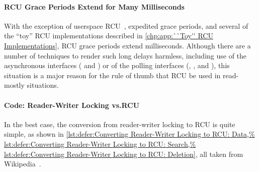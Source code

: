 \QuickQuizEnd

\paragraph{RCU Grace Periods Extend for Many Milliseconds}

With the exception of userspace
RCU~\cite{MathieuDesnoyers2009URCU,PaulMcKenney2013LWNURCU},
expedited grace periods, and several of the ``toy''
RCU implementations described in
\cref{chp:app:``Toy'' RCU Implementations},
RCU grace periods extend milliseconds.
Although there are a number of techniques to render such long
delays harmless, including use of the asynchronous interfaces
( and ) or of the polling interfaces
(, ,
and ), this situation is a major reason
for the rule of thumb that RCU be used in read-mostly situations.

\paragraph{Code:
		 Reader-Writer Locking vs.\@ RCU}

In the best case, the conversion from reader-writer locking to RCU
is quite simple, as shown in
\cref{lst:defer:Converting Reader-Writer Locking to RCU: Data,%
lst:defer:Converting Reader-Writer Locking to RCU: Search,%
lst:defer:Converting Reader-Writer Locking to RCU: Deletion},
all taken from
Wikipedia~\cite{WikipediaRCU}.

